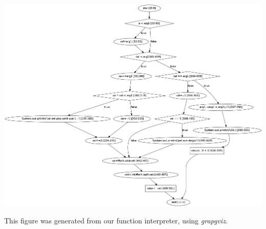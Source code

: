 \documentclass[a4paper]{report}
\begin{document}
   \centerline{
   \includegraphics[scale=0.3]{../graphviz/realExemple.png}
}
This figure was generated from our function interpreter, using \textit{grapgviz}.
\newpage
\end{document}
